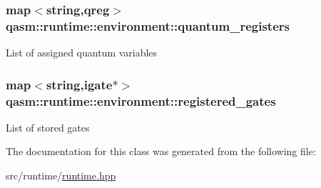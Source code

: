 \subsubsection[{\texorpdfstring{quantum\+\_\+registers}{quantum_registers}}]{\setlength{\rightskip}{0pt plus 5cm}map$<$string,{\bf qreg}$>$ qasm\+::runtime\+::environment\+::quantum\+\_\+registers\hspace{0.3cm}{\ttfamily [private]}}\hypertarget{classqasm_1_1runtime_1_1environment_ae65dc834296334c8b9ea6dd900210881}{}\label{classqasm_1_1runtime_1_1environment_ae65dc834296334c8b9ea6dd900210881}
List of assigned quantum variables 
\subsubsection[{\texorpdfstring{registered\+\_\+gates}{registered_gates}}]{\setlength{\rightskip}{0pt plus 5cm}map$<$string,{\bf igate}$\ast$$>$ qasm\+::runtime\+::environment\+::registered\+\_\+gates\hspace{0.3cm}{\ttfamily [private]}}\hypertarget{classqasm_1_1runtime_1_1environment_a05ec9211b7760c478dba445db34261b7}{}\label{classqasm_1_1runtime_1_1environment_a05ec9211b7760c478dba445db34261b7}
List of stored gates 

The documentation for this class was generated from the following file\+:\begin{DoxyCompactItemize}
\item 
src/runtime/\hyperlink{runtime_8hpp}{runtime.\+hpp}\end{DoxyCompactItemize}
